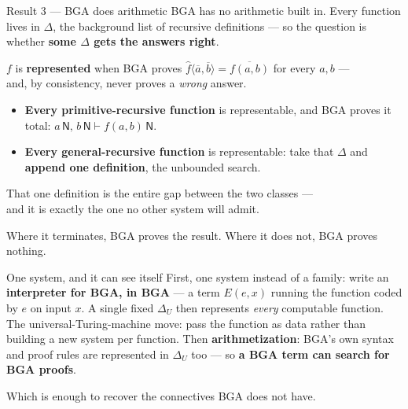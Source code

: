 \documentclass[aspectratio=169,11pt]{beamer}
\newcommand{\key}[1]{{\color{accent}\textbf{#1}}}
\begin{document}
\begin{frame}{Result 3 --- BGA does arithmetic}
  \vfill
  BGA has no arithmetic built in. Every function lives in $\Delta$, the background
  list of recursive definitions --- so the question is whether \key{some $\Delta$
  gets the answers right}.
  \vfill
  \begin{center}\small
    $f$ is \key{represented} when BGA proves
    $\hat f\langle \overline{a},\overline{b}\rangle = \overline{f(a,b)}$ for every
    $a,b$ ---\\ and, by consistency, never proves a \emph{wrong} answer.
  \end{center}
  \vfill
  \pause
  \begin{itemize}\itemsep0.7em
    \item \key{Every primitive-recursive function} is representable, and BGA proves
          it total: $a\,\mathsf{N},\, b\,\mathsf{N} \vdash f(a,b)\,\mathsf{N}$.
    \item \key{Every general-recursive function} is representable: take that $\Delta$
          and \key{append one definition}, the unbounded search.
  \end{itemize}
  \vfill
  \pause
  \begin{center}
    That one definition is the entire gap between the two classes ---\\
    and it is exactly the one no other system will admit.
  \end{center}
  \vfill
  \begin{center}\footnotesize
    Where it terminates, BGA proves the result. Where it does not, BGA proves nothing.
  \end{center}
\end{frame}

\begin{frame}{One system, and it can see itself}
  \vfill
  First, one system instead of a family: write an \key{interpreter for BGA, in BGA}
  --- a term $E(e,x)$ running the function coded by $e$ on input $x$.
  A single fixed $\Delta_U$ then represents \emph{every} computable function.\\
  {\footnotesize The universal-Turing-machine move: pass the function as data rather than
   building a new system per function.}
  \vfill
  \pause
  Then \key{arithmetization}: BGA's own syntax and proof rules are represented in
  $\Delta_U$ too --- so \key{a BGA term can search for BGA proofs}.
  \vfill
  \pause
  \begin{center}\large
    Which is enough to recover the connectives BGA does not have.
  \end{center}
  \vfill
\end{frame}
\end{document}
